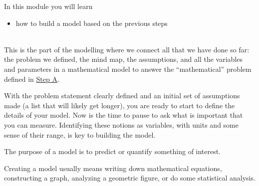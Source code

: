 
In this module you will learn
\begin{itemize}
	\item how to build a model based on the previous steps
\end{itemize}

\hfill \\



This is the part of the modelling where we connect all that we have done so far: the problem we defined, the mind map, the assumptions, and all the variables and parameters in a mathematical model to answer the ``mathematical'' problem defined in \hyperref[define]{Step A}.


	
	
With the problem statement clearly defined and an initial set of assumptions made (a list that will likely get longer), you are ready to start to define the details of your model. Now is the time to pause to ask what is important that you can measure. 
Identifying these notions as variables, with units and some sense of their range, is key to building the model.

The purpose of a model is to predict or quantify something of interest. %
	
Creating a model usually means writing down mathematical equations, constructing a graph, analyzing a geometric figure, or do some statistical analysis. \\


